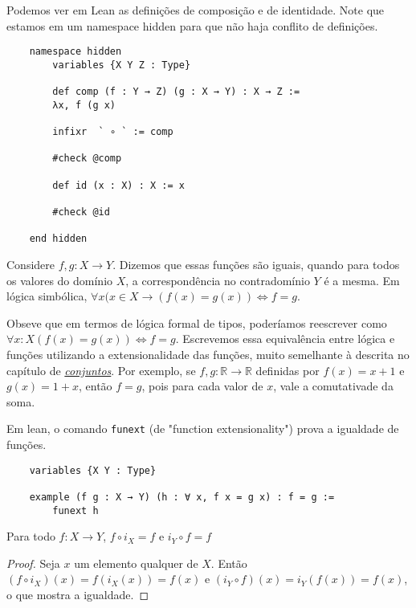 Podemos ver em Lean as definições de composição e de identidade. Note que estamos em um namespace
hidden para que não haja conflito de definições.

\begin{lstlisting}
    namespace hidden
        variables {X Y Z : Type}

        def comp (f : Y → Z) (g : X → Y) : X → Z :=
        λx, f (g x)

        infixr  ` ∘ ` := comp

        #check @comp

        def id (x : X) : X := x

        #check @id

    end hidden
\end{lstlisting}

\begin{definition}
    \label{def3}
    Considere $f,g : X \to Y$. Dizemos que essas funções são iguais,
    quando para todos os valores do domínio $X$, a correspondência no contradomínio $Y$ é a
    mesma. Em lógica simbólica, $\forall x (x \in X \to (f(x) = g(x)) \iff f = g $.
\end{definition}

Obseve que em termos de lógica formal de tipos, poderíamos reescrever como
$\forall x : X (f(x) = g(x)) \iff f = g$. Escrevemos essa equivalência entre lógica e funções
utilizando a extensionalidade das funções, muito semelhante à descrita no capítulo de
\textit{\hyperlink{chapter.5}{conjuntos}}. Por exemplo, se $f, g : \mathbb{R} \to \mathbb{R}$
definidas por $f(x) = x + 1$ e $g(x) = 1 + x$, então $f = g$, pois para cada valor de $x$, vale
a comutativade da soma.

Em lean, o comando \lstinline{funext} (de "function extensionality") prova a igualdade de funções.

\begin{lstlisting}
    variables {X Y : Type}

    example (f g : X → Y) (h : ∀ x, f x = g x) : f = g :=
        funext h
\end{lstlisting}

\begin{theorem}
    \label{prop1}
    Para todo $f: X \to Y$, $f \circ i_X = f$ e $i_Y \circ f = f$
\end{theorem}
\begin{proof}
    Seja $x$ um elemento qualquer de $X$. Então $(f \circ i_X)(x) = f(i_X(x)) = f(x)$
     e $(i_Y \circ f)(x) = i_Y(f(x)) = f(x)$, o que mostra a igualdade.
\end{proof}

